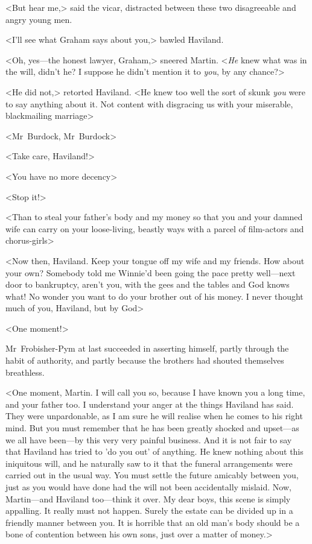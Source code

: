 <But hear me,> said the vicar, distracted between these two disagreeable and angry young men.

<I'll see what Graham says about you,> bawled Haviland.

<Oh, yes—the honest lawyer, Graham,> sneered Martin. <\emph{He} knew what was in the will, didn't he? I suppose he didn't mention it to \emph{you}, by any chance?>

<He did not,> retorted Haviland. <He knew too well the sort of skunk \emph{you} were to say anything about it. Not content with disgracing us with your miserable, blackmailing marriage\longdash>

<Mr~Burdock, Mr~Burdock\longdash>

<Take care, Haviland!>

<You have no more decency\longdash>

<Stop it!>

<Than to steal your father's body and my money so that you and your damned wife can carry on your loose-living, beastly ways with a parcel of film-actors and chorus-girls\longdash>

<Now then, Haviland. Keep your tongue off my wife and my friends. How about your own? Somebody told me Winnie'd been going the pace pretty well—next door to bankruptcy, aren't you, with the gees and the tables and God knows what! No wonder you want to do your brother out of his money. I never thought much of you, Haviland, but by God\longdash>

<One moment!>

Mr~Frobisher-Pym at last succeeded in asserting himself, partly through the habit of authority, and partly because the brothers had shouted themselves breathless.

<One moment, Martin. I will call you so, because I have known you a long time, and your father too. I understand your anger at the things Haviland has said. They were unpardonable, as I am sure he will realise when he comes to his right mind. But you must remember that he has been greatly shocked and upset—as we all have been—by this very very painful business. And it is not fair to say that Haviland has tried to 'do you out' of anything. He knew nothing about this iniquitous will, and he naturally saw to it that the funeral arrangements were carried out in the usual way. You must settle the future amicably between you, just as you would have done had the will not been accidentally mislaid. Now, Martin—and Haviland too—think it over. My dear boys, this scene is simply appalling. It really must not happen. Surely the estate can be divided up in a friendly manner between you. It is horrible that an old man's body should be a bone of contention between his own sons, just over a matter of money.>


